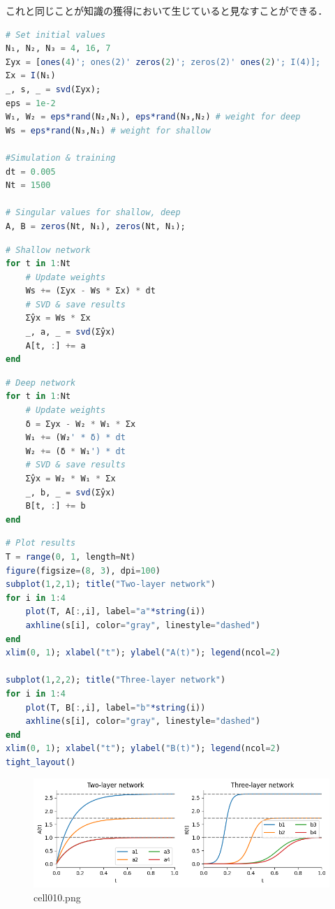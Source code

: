 これと同じことが知識の獲得において生じていると見なすことができる．
\begin{lstlisting}[language=julia]
# Set initial values
N₁, N₂, N₃ = 4, 16, 7
Σyx = [ones(4)'; ones(2)' zeros(2)'; zeros(2)' ones(2)'; I(4)];
Σx = I(N₁)
_, s, _ = svd(Σyx);
eps = 1e-2
W₁, W₂ = eps*rand(N₂,N₁), eps*rand(N₃,N₂) # weight for deep
Ws = eps*rand(N₃,N₁) # weight for shallow

#Simulation & training
dt = 0.005
Nt = 1500

# Singular values for shallow, deep
A, B = zeros(Nt, N₁), zeros(Nt, N₁); 
\end{lstlisting}
\begin{lstlisting}[language=julia]
# Shallow network
for t in 1:Nt
    # Update weights
    Ws += (Σyx - Ws * Σx) * dt   
    # SVD & save results
    Σ̂yx = Ws * Σx
    _, a, _ = svd(Σ̂yx)
    A[t, :] += a
end
\end{lstlisting}
\begin{lstlisting}[language=julia]
# Deep network
for t in 1:Nt
    # Update weights
    δ = Σyx - W₂ * W₁ * Σx
    W₁ += (W₂' * δ) * dt
    W₂ += (δ * W₁') * dt
    # SVD & save results
    Σ̂yx = W₂ * W₁ * Σx
    _, b, _ = svd(Σ̂yx)
    B[t, :] += b
end
\end{lstlisting}
\begin{lstlisting}[language=julia]
# Plot results
T = range(0, 1, length=Nt)
figure(figsize=(8, 3), dpi=100)
subplot(1,2,1); title("Two-layer network")
for i in 1:4
    plot(T, A[:,i], label="a"*string(i))
    axhline(s[i], color="gray", linestyle="dashed")
end
xlim(0, 1); xlabel("t"); ylabel("A(t)"); legend(ncol=2)

subplot(1,2,2); title("Three-layer network")
for i in 1:4
    plot(T, B[:,i], label="b"*string(i))
    axhline(s[i], color="gray", linestyle="dashed")
end
xlim(0, 1); xlabel("t"); ylabel("B(t)"); legend(ncol=2)
tight_layout()
\end{lstlisting}
\begin{figure}[ht]
	\centering
	\includegraphics[scale=0.8, max width=\linewidth]{./fig/solve-credit-assignment-problem/linear-network-learning-dynamics/cell010.png}
	\caption{cell010.png}
	\label{cell010.png}
\end{figure}
